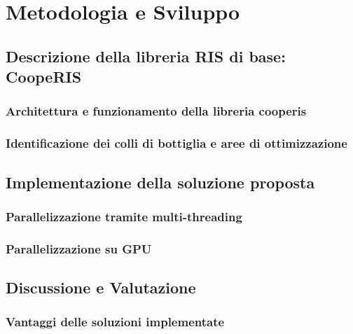 \chapter{Metodologia e Sviluppo}
\label{ch:metodologiasviluppo}

\section{Descrizione della libreria RIS di base: CoopeRIS}
\label{sec:libreria}

\lipsum[1]

\subsection{Architettura e funzionamento della libreria cooperis}
\label{sec:architettura}

\lipsum[1]

\subsection{Identificazione dei colli di bottiglia e aree di ottimizzazione}
\label{sec:ottimizzazione}

\lipsum[1]

\section{Implementazione della soluzione proposta}
\label{sec:implementazione}

\lipsum[1]

\subsection{Parallelizzazione tramite multi-threading}
\label{subsec:multithreading}

\lipsum[1]

\subsection{Parallelizzazione su GPU}
\label{subsec:cuda}

\lipsum[1]

\section{Discussione e Valutazione}
\label{ch:discussione}

\subsection{Vantaggi delle soluzioni implementate}
\label{subsec:vantaggi}

